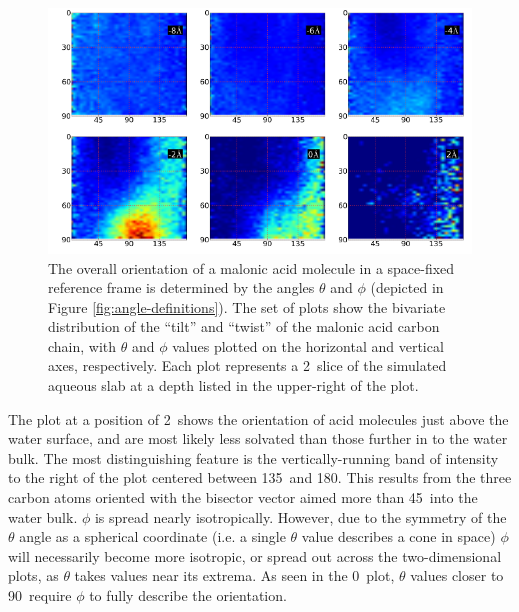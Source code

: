 \begin{figure}[h!]
	\begin{center}
		\includegraphics[scale=1.0]{images/malonic-angles/carbonbackbone-theta-phi.png}
		\caption{The overall orientation of a malonic acid molecule in a space-fixed reference frame is determined by the angles $\theta$ and $\phi$ (depicted in Figure \ref{fig:angle-definitions}). The set of plots show the bivariate distribution of the ``tilt'' and ``twist'' of the malonic acid carbon chain, with $\theta$ and $\phi$ values plotted on the horizontal and vertical axes, respectively. Each plot represents a 2\angs~slice of the simulated aqueous slab at a depth listed in the upper-right of the plot.}
		\label{fig:backbone-theta-phi}
	\end{center}
\end{figure}

The plot at a position of 2\angs~shows the orientation of acid molecules just above the water surface, and are most likely less solvated than those further in to the water bulk. The most distinguishing feature is the vertically-running band of intensity to the right of the plot centered between 135\textdegree~and 180\textdegree. This results from the three carbon atoms oriented with the bisector vector aimed more than 45\textdegree~into the water bulk. $\phi$ is spread nearly isotropically. However, due to the symmetry of the $\theta$ angle as a spherical coordinate (i.e. a single $\theta$ value describes a cone in space) $\phi$ will necessarily become more isotropic, or spread out across the two-dimensional plots, as $\theta$ takes values near its extrema. As seen in the 0\angs~plot, $\theta$ values closer to 90\textdegree~require $\phi$ to fully describe the orientation.

